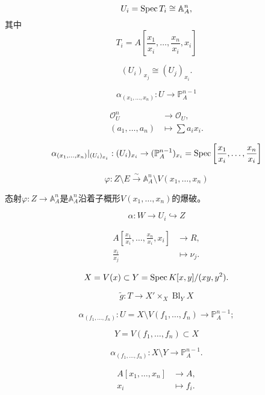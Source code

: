 


\[
	U_i=\operatorname{Spec} T_i\cong \mathbb A_A^n,
\]
其中
\[
	T_i=A\left[\frac{x_1}{x_i},\dots,\frac{x_n}{x_i},x_i\right]
\]

\[
	(U_i)_{x_j}\cong (U_j)_{x_i}.
\]


\[
	\alpha_{(x_1,\dots,x_n)}:U\to \mathbb P_A^{n-1}
\]

\[
	\begin{aligned}
		\mathscr O_U^n & \longrightarrow \mathscr O_U,\\
		(a_1,\dots,a_n)&\longmapsto \sum a_ix_i.
	\end{aligned}
\]

\[
	\alpha_{(x_1,\dots,x_n)}|_{(U_i)_{x_i}}:(U_i)_{x_i}\to (\mathbb P_A^{n-1})_{x_i}=\operatorname{Spec} \left[\frac{x_1}{x_i},\dots,\frac{x_n}{x_i}\right]
\]

\[
	\varphi:Z\setminus E\xrightarrow{\sim}\mathbb A_A^n\setminus V(x_1,\dots,x_n)
\]

\begin{pro}\label{pro:4.18}
	态射$\varphi:Z\to \mathbb A_A^n$是$\mathbb A_A^n$沿着子概形$V(x_1,\dots,x_n)$的爆破。
\end{pro}


\[
	\alpha:W\to U_i\hookrightarrow Z
\]

\[
	\begin{aligned}
		A\left[\frac{x_1}{x_i},\dots,\frac{x_n}{x_i},x_i\right] & \longrightarrow R,\\
		\frac{x_i}{x_j}&\longmapsto \nu_j.
	\end{aligned}
\]

\[
	X=V(x)\subset Y=\operatorname{Spec} K[x,y]/(xy,y^2).
\]



\[
	\tilde g:T\to X'\times_X \operatorname{Bl}_Y X
\]

\[
	\alpha_{(f_1,\dots,f_n)}:U=X\setminus V(f_1,\dots,f_n)\longrightarrow \mathbb P_A^{n-1};
\]

\[
	Y=V(f_1,\dots,f_n)\subset X
\]

\[
	\alpha_{(f_1,\dots,f_n)}:X\setminus Y\longrightarrow \mathbb P_A^{n-1}.
\]

\[
	\begin{aligned}
		A\left[x_1,\dots,x_n\right] & \longrightarrow A,\\
		x_i &\longmapsto f_i.
	\end{aligned}
\]


